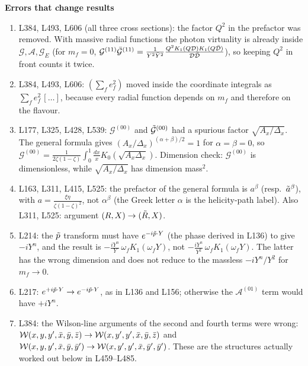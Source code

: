 \documentclass[9pt]{article}
\numberwithin{equation}{section}
\begin{document}
\noindent\textbf{Errors that change results}
\begin{enumerate}
    \item L384, L493, L606 (all three cross sections): the factor $Q^{2}$ in the prefactor was removed. With massive radial functions the photon virtuality is already inside $\mathcal{G},\mathcal{A},\mathcal{G}_{E}$ (for $m_{f}=0$, $\mathcal{G}^{(11)}\Bar{\mathcal{G}}^{(11)} = \frac{1}{Y^{2}\Bar{Y}^{2}}\frac{Q^{2}K_{1}(Q\mathcal{D})K_{1}(Q\Bar{\mathcal{D}})}{\mathcal{D}\Bar{\mathcal{D}}}$), so keeping $Q^{2}$ in front counts it twice.
    \item L384, L493, L606: $\left(\sum_{f}e^{2}_{f}\right)$ moved inside the coordinate integrals as $\sum_{f}e^{2}_{f}\,[\ldots]$, because every radial function depends on $m_{f}$ and therefore on the flavour.
    \item L177, L325, L428, L539: $\mathcal{G}^{(00)}$ and $\Tilde{\mathcal{G}}^{(00)}$ had a spurious factor $\sqrt{A_{x}/\Delta_{x}}$. The general formula gives $(A_{x}/\Delta_{x})^{(\alpha+\beta)/2}=1$ for $\alpha=\beta=0$, so $\mathcal{G}^{(00)}=\frac{1}{2\zeta(1-\zeta)}\int_{0}^{1}\frac{dx}{x}K_{0}(\sqrt{A_{x}\Delta_{x}})$. Dimension check: $\mathcal{G}^{(00)}$ is dimensionless, while $\sqrt{A_{x}/\Delta_{x}}$ has dimension mass$^{2}$.
    \item L163, L311, L415, L525: the prefactor of the general formula is $a^{\beta}$ (resp.\ $\Tilde{a}^{\beta}$), with $a=\frac{\xi\eta}{\zeta(1-\zeta)^{2}}$, not $\alpha^{\beta}$ (the Greek letter $\alpha$ is the helicity-path label). Also L311, L525: argument $(R,X)\rightarrow(\Tilde{R},X)$.
    \item L214: the $\Tilde{p}$ transform must have $e^{-i\Tilde{p}\cdot Y}$ (the phase derived in L136) to give $-iY^{n}$, and the result is $-\frac{iY^{n}}{Y}\,\omega_{f}K_{1}(\omega_{f}Y)$, not $-\frac{iY^{n}}{Y^{2}}\,\omega_{f}K_{1}(\omega_{f}Y)$. The latter has the wrong dimension and does not reduce to the massless $-iY^{n}/Y^{2}$ for $m_{f}\rightarrow 0$.
    \item L217: $e^{+i\Tilde{p}\cdot Y}\rightarrow e^{-i\Tilde{p}\cdot Y}$, as in L136 and L156; otherwise the $\mathcal{A}^{(01)}$ term would have $+iY^{n}$.
    \item L384: the Wilson-line arguments of the second and fourth terms were wrong: $\mathcal{W}(x,y,y',\Bar{x},\Bar{y},\Bar{z})\rightarrow\mathcal{W}(x,y',y',\Bar{x},\Bar{y},\Bar{z})$ and $\mathcal{W}(x,y,y',\Bar{x},\Bar{y},\Bar{y}')\rightarrow\mathcal{W}(x,y',y',\Bar{x},\Bar{y}',\Bar{y}')$. These are the structures actually worked out below in L459--L485.

\end{enumerate}
\end{document}
